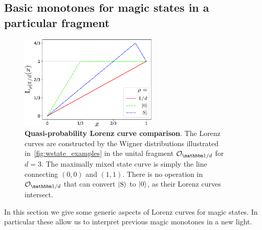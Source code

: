 \documentclass[pra,
aps,
twocolumn,
superscriptaddress,
groupedaddress,
nofootinbib,
reprint
]{revtex4-1}
\begin{document}
\subsection{Basic monotones for magic states in a particular fragment}
\label{sec:lc}

\begin{figure}
    \centering
    \includegraphics[height=4.5cm]{figs/lctoy.pdf}
    \caption{\textbf{Quasi-probability Lorenz curve comparison}.
    The Lorenz curves are constructed by the Wigner distributions illustrated in~\cref{fig:wstate_examples} in the unital fragment $\O_{\id/d}$ for $d=3$.
    The maximally mixed state curve is simply the line connecting $(0,0)$ and $(1,1)$.
    There is no operation in $\O_{\id/d}$ that can convert $\ket{\rm{S}}$ to $\ket{0}$, as their Lorenz curves intersect.
    }
    \label{fig:lctoy}
\end{figure}

In this section we give some generic aspects of Lorenz curves for magic states. In particular these allow us to interpret previous magic monotones in a new light.
\end{document}
